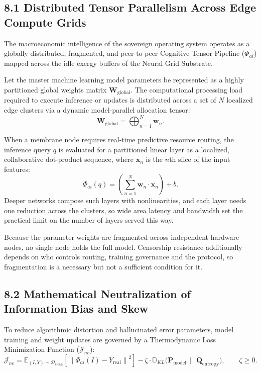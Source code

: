 \documentclass[11pt,a4paper]{article}
\theoremstyle{definition}
\theoremstyle{plain}
\theoremstyle{remark}
\begin{document}
\subsection*{8.1 Distributed Tensor Parallelism Across Edge Compute Grids}
The macroeconomic intelligence of the sovereign operating system operates as a globally distributed, fragmented, and peer-to-peer Cognitive Tensor Pipeline ($\Phi_{ai}$) mapped across the idle exergy buffers of the Neural Grid Substrate.

Let the master machine learning model parameters be represented as a highly partitioned global weights matrix $\mathbf W_{\mathrm{global}}$. The computational processing load required to execute inference or updates is distributed across a set of $N$ localized edge clusters via a dynamic model-parallel allocation tensor:
\begin{equation}
\mathbf W_{\mathrm{global}} = \bigoplus_{n=1}^{N} \mathbf w_n .
\end{equation}

When a membrane node requires real-time predictive resource routing, the inference query $q$ is evaluated for a partitioned linear layer as a localized, collaborative dot-product sequence, where $\mathbf x_n$ is the $n$th slice of the input features:
\begin{equation}
\Phi_{ai}(q) = \left( \sum_{n=1}^{N} \mathbf w_n \cdot \mathbf x_n \right) + b .
\end{equation}
Deeper networks compose such layers with nonlinearities, and each layer needs one reduction across the clusters, so wide area latency and bandwidth set the practical limit on the number of layers served this way.

Because the parameter weights are fragmented across independent hardware nodes, no single node holds the full model. Censorship resistance additionally depends on who controls routing, training governance and the protocol, so fragmentation is a necessary but not a sufficient condition for it.

\subsection*{8.2 Mathematical Neutralization of Information Bias and Skew}
To reduce algorithmic distortion and hallucinated error parameters, model training and weight updates are governed by a Thermodynamic Loss Minimization Function ($\mathcal J_{ne}$):
\begin{equation}
\mathcal J_{ne}
= \mathbb E_{(I, Y) \sim \mathcal D_{\mathrm{clean}}}
\left[ \left\| \Phi_{ai}(I) - Y_{\mathrm{real}} \right\|^{2} \right]
- \zeta \cdot \mathbb D_{KL}\big( \mathbf P_{\mathrm{model}} \,\big\|\, \mathbf Q_{\mathrm{entropy}} \big),
\qquad \zeta \ge 0 .
\end{equation}
\end{document}
